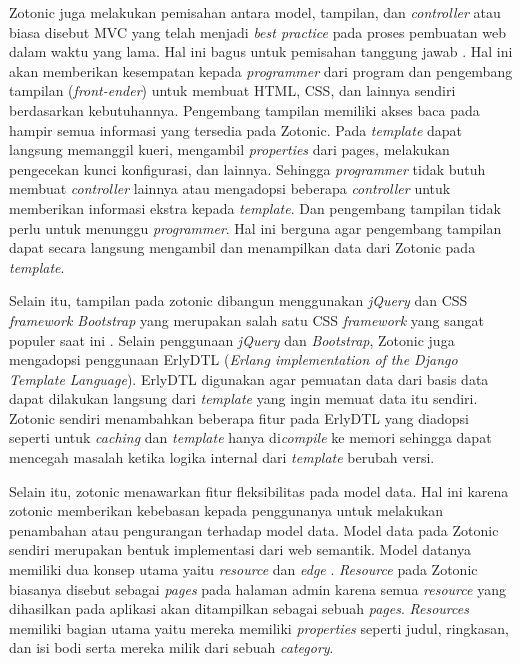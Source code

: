 Zotonic juga melakukan pemisahan antara model, tampilan, dan \textit{controller} atau biasa disebut MVC yang telah menjadi \textit{best practice} pada proses pembuatan web dalam waktu yang lama. Hal ini bagus untuk pemisahan tanggung jawab \citep{zotonic.mvc}. Hal ini akan memberikan kesempatan kepada \textit{programmer} dari program dan pengembang tampilan (\textit{front-ender}) untuk membuat HTML, CSS, dan lainnya sendiri berdasarkan kebutuhannya. Pengembang tampilan memiliki akses baca pada hampir semua informasi yang tersedia pada Zotonic. Pada \textit{template} dapat langsung memanggil kueri, mengambil \textit{properties} dari pages, melakukan pengecekan kunci konfigurasi, dan lainnya. Sehingga \textit{programmer} tidak butuh membuat \textit{controller} lainnya atau mengadopsi beberapa \textit{controller} untuk memberikan informasi ekstra kepada \textit{template}. Dan pengembang tampilan tidak perlu untuk menunggu \textit{programmer}. Hal ini berguna agar pengembang tampilan dapat secara langsung mengambil dan menampilkan data dari Zotonic pada \textit{template}.

Selain itu, tampilan pada zotonic dibangun menggunakan \textit{jQuery} dan CSS \textit{framework Bootstrap} yang merupakan salah satu CSS \textit{framework} yang sangat populer saat ini \citep{awwwards.css}. Selain penggunaan \textit{jQuery} dan \textit{Bootstrap}, Zotonic juga mengadopsi penggunaan ErlyDTL (\textit{Erlang implementation of the Django Template Language}). ErlyDTL digunakan agar pemuatan data dari basis data dapat dilakukan langsung dari \textit{template} yang ingin memuat data itu sendiri. Zotonic sendiri menambahkan beberapa fitur pada ErlyDTL yang diadopsi seperti untuk \textit{caching} dan \textit{template} hanya di\textit{compile} ke memori sehingga dapat mencegah masalah ketika logika internal dari \textit{template} berubah versi.

Selain itu, zotonic menawarkan fitur fleksibilitas pada model data. Hal ini karena zotonic memberikan kebebasan kepada penggunanya untuk melakukan penambahan atau pengurangan terhadap model data. Model data pada Zotonic sendiri merupakan bentuk implementasi dari web semantik. Model datanya memiliki dua konsep utama yaitu \textit{resource} dan \textit{edge} \citep{zotonic.model}. \textit{Resource} pada Zotonic biasanya disebut sebagai \textit{pages} pada halaman admin karena semua \textit{resource} yang dihasilkan pada aplikasi akan ditampilkan sebagai sebuah \textit{pages}. \textit{Resources} memiliki bagian utama yaitu mereka memiliki \textit{properties} seperti judul, ringkasan, dan isi bodi serta mereka milik dari sebuah \textit{category}.

